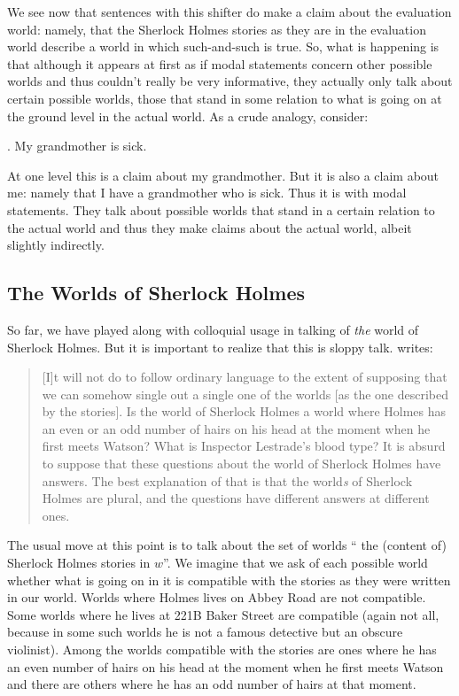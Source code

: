We see now that sentences with this shifter do make a claim about the evaluation
world: namely, that the Sherlock Holmes stories as they are in the evaluation
world describe a world in which such-and-such is true. So, what is happening is
that although it appears at first as if modal statements concern other possible
worlds and thus couldn't really be very informative, they actually only talk
about certain possible worlds, those that stand in some relation to what is
going on at the ground level in the actual world. As a crude analogy, consider:

\ex. My grandmother is sick.

At one level this is a claim about my grandmother. But it is also a claim about
me: namely that I have a grandmother who is sick. Thus it is with modal
statements. They talk about possible worlds that stand in a certain relation to
the actual world and thus they make claims about the actual world, albeit
slightly indirectly.

\subsection{The Worlds of Sherlock Holmes} \label{sec:worlds-sherl-holm}

So far, we have played along with colloquial usage in talking of \emph{the}
world of Sherlock Holmes. But it is important to realize that this is sloppy
talk. \citet{lewis:1978:fiction} writes:

\begin{quote}
  [I]t will not do to follow ordinary language to the extent of supposing that
  we can somehow single out a single one of the worlds [as the one described by
  the stories]. Is the world of Sherlock Holmes a world where Holmes has an even
  or an odd number of hairs on his head at the moment when he first meets
  Watson? What is Inspector Lestrade's blood type? It is absurd to suppose that
  these questions about the world of Sherlock Holmes have answers. The best
  explanation of that is that the world\emph{s} of Sherlock Holmes are plural,
  and the questions have different answers at different ones.
\end{quote}
%
The usual move at this point is to talk about the set of worlds
`` the (content of) Sherlock Holmes stories in $w$''. We
imagine that we ask of each possible world whether what is going on in it is
compatible with the stories as they were written in our world. Worlds where
Holmes lives on Abbey Road are not compatible. Some worlds where he lives at
221B Baker Street are compatible (again not all, because in some such worlds he
is not a famous detective but an obscure violinist). Among the worlds compatible
with the stories are ones where he has an even number of hairs on his head at
the moment when he first meets Watson and there are others where he has an odd
number of hairs at that moment.

